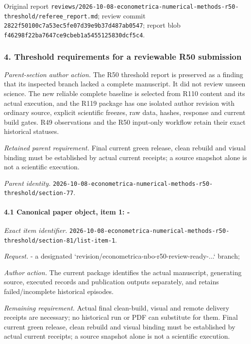 Original report \nolinkurl{reviews/2026-10-08-econometrica-numerical-methods-r50-threshold/referee_report.md}; review commit \nolinkurl{2822f50100c7a53ec5fe07d39e9b37d487ab0547}; report blob \nolinkurl{f46298f22ba7647ce9cbeb1a5455125830dcf5c4}.

\subsubsection{4. Threshold requirements for a reviewable R50 submission}

\emph{Parent-section author action.} The R50 threshold report is preserved as a finding that its inspected branch lacked a complete manuscript. It did not review unseen science. The new reliable complete baseline is selected from R110 content and its actual execution, and the R119 package has one isolated author revision with ordinary source, explicit scientific freezes, raw data, hashes, response and current build gates. R49 observations and the R50 input-only workflow retain their exact historical statuses.

\par\emph{Retained parent requirement.} Final current green release, clean rebuild and visual binding must be established by actual current receipts; a source snapshot alone is not a scientific execution.

\par\emph{Parent identity.} \nolinkurl{2026-10-08-econometrica-numerical-methods-r50-threshold/section-77}.

\paragraph{4.1 Canonical paper object, item 1: -}

\emph{Exact item identifier.} \nolinkurl{2026-10-08-econometrica-numerical-methods-r50-threshold/section-81/list-item-1}.

\par\emph{Request.} - a designated `revision/\allowbreak{}econometrica-nbo-r50-review-ready-...` branch;

\par\emph{Author action.} The current package identifies the actual manuscript, generating source, executed records and publication outputs separately, and retains failed/\allowbreak{}incomplete historical episodes.

\par\emph{Remaining requirement.} Actual final clean-build, visual and remote delivery receipts are necessary; no historical run or PDF can substitute for them. Final current green release, clean rebuild and visual binding must be established by actual current receipts; a source snapshot alone is not a scientific execution.

